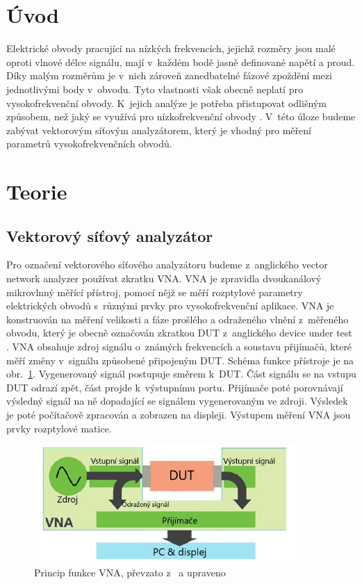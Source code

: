 \documentclass{protokol}
\begin{document}
\headernoenv

\section{Úvod}
Elektrické obvody pracující na nízkých frekvencích,
jejichž rozměry jsou malé oproti vlnové délce signálu,
mají v~každém bodě jasně definované napětí a proud.
Díky malým rozměrům je v~nich zároveň zanedbatelné fázové zpoždění
mezi jednotlivými body v~obvodu.
Tyto vlastnosti však obecně neplatí pro vysokofrekvenční obvody.
K~jejich analýze je potřeba přistupovat odlišným způsobem,
než jaký se využívá pro nízkofrekvenční obvody \cite{pozar}.
V~této úloze budeme zabývat vektorovým síťovým analyzátorem,
který je vhodný pro měření parametrů vysokofrekvenčních obvodů.

\section{Teorie}

\subsection{Vektorový síťový analyzátor}

Pro označení vektorového síťového analyzátoru budeme z~anglického
vector network analyzer používat zkratku VNA.
VNA je zpravidla dvoukanálový mikrovlnný měřící přístroj,
pomocí nějž se měří rozptylové parametry elektrických obvodů
s~různými prvky pro vysokofrekvenční aplikace.
VNA je konstruován na měření velikosti a fáze prošlého a odraženého vlnění
z~měřeného obvodu,
který je obecně označován zkratkou DUT z~anglického device 
under test \cite{pozar}.
VNA obsahuje zdroj signálu o~známých frekvencích a soustavu přijímačů,
které měří změny v~signálu způsobené připojeným DUT.
Schéma funkce přístroje je na obr.~\ref{VNA}.
Vygenerovaný signál postupuje směrem k~DUT.
Část signálu se na vstupu DUT odrazí zpět, část projde k~výstupnímu portu.
Přijímače poté porovnávají výsledný signál na ně dopadající
se signálem vygenerovaným ve zdroji.
Výsledek je poté počítačově zpracován a zobrazen na displeji.
Výstupem měření VNA jsou prvky rozptylové matice.

\begin{figure}[b]
	\centering
	\includegraphics[width=100mm,]{network-analyzer-diagram}
	\caption{Princip funkce VNA, převzato z~\cite{tektronix} a upraveno}
	\label{VNA}
\end{figure}
\end{document}
